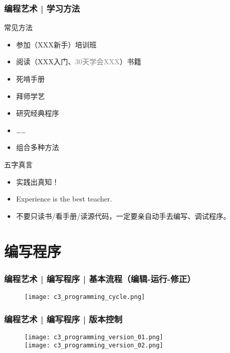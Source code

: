 \begin{frame}
  \frametitle{编程艺术 | 学习方法}
  \begin{block}{常见方法}
    \begin{itemize}
      \item 参加（XXX新手）培训班
      \item 阅读（XXX入门、\textcolor{gray}{30天学会XXX}）书籍
      \item 死啃手册
      \item 拜师学艺
      \item 研究经典程序
      \item ……
      \item 组合多种方法
    \end{itemize}
  \end{block}
  \pause
  \begin{block}{\alert{五字真言}}
    \begin{itemize}
      \item 实践出真知！
      \item Experience is the best teacher.
      \item 不要只读书/看手册/读源代码，一定要亲自动手去编写、调试程序。
    \end{itemize}
  \end{block}
\end{frame}

\section{编写程序}
\begin{frame}
  \frametitle{编程艺术 | 编写程序 | \alert{基本流程（编辑-运行-修正）}}
  \begin{figure}
    \centering
    \texttt{[image: c3\_programming\_cycle.png]}
  \end{figure}
\end{frame}

\begin{frame}
  \frametitle{编程艺术 | 编写程序 | 版本控制}
  \begin{figure}
    \centering
    \texttt{[image: c3\_programming\_version\_01.png]}\\
    \texttt{[image: c3\_programming\_version\_02.png]}\\
  \end{figure}
\end{frame}

